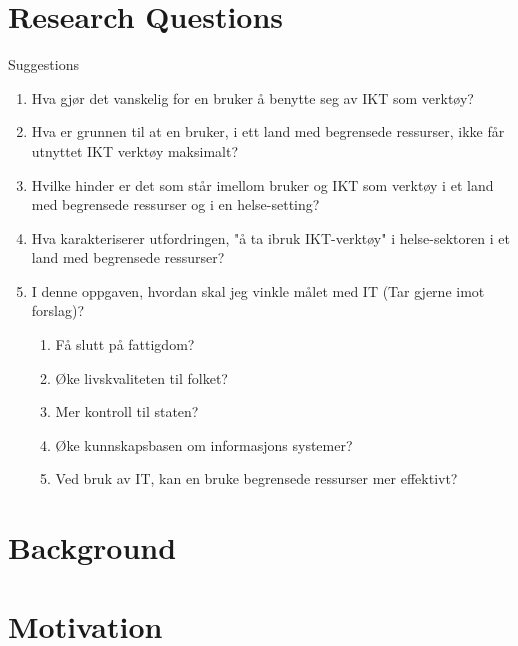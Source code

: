 \section{Research Questions}
\large{Suggestions}
\begin{enumerate}
\item Hva gjør det vanskelig for en bruker å benytte seg av IKT som verktøy?
\item Hva er grunnen til at en bruker, i ett land med begrensede ressurser, ikke får utnyttet IKT verktøy maksimalt?
\item Hvilke hinder er det som står imellom bruker og IKT som verktøy i et land med begrensede ressurser og i en helse-setting?
\item Hva karakteriserer utfordringen, "å ta ibruk IKT-verktøy" i helse-sektoren i et land med begrensede ressurser?
\item I denne oppgaven, hvordan skal jeg vinkle målet med IT (Tar gjerne imot forslag)?
	\begin{enumerate}
	\item Få slutt på fattigdom?
	\item Øke livskvaliteten til folket?
	\item Mer kontroll til staten?
	\item Øke kunnskapsbasen om informasjons systemer?
	\item Ved bruk av IT, kan en bruke begrensede ressurser mer effektivt?
	\end{enumerate}
\end{enumerate}

\section{Background}

\section{Motivation}